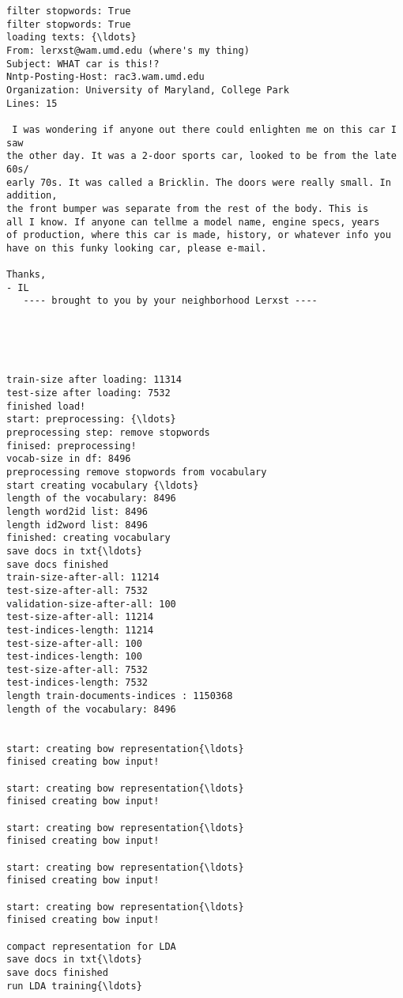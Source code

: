 \documentclass[11pt]{article}
\begin{document}
    \begin{Verbatim}[commandchars=\\\{\}]
filter stopwords: True
filter stopwords: True
loading texts: {\ldots}
From: lerxst@wam.umd.edu (where's my thing)
Subject: WHAT car is this!?
Nntp-Posting-Host: rac3.wam.umd.edu
Organization: University of Maryland, College Park
Lines: 15

 I was wondering if anyone out there could enlighten me on this car I saw
the other day. It was a 2-door sports car, looked to be from the late 60s/
early 70s. It was called a Bricklin. The doors were really small. In addition,
the front bumper was separate from the rest of the body. This is
all I know. If anyone can tellme a model name, engine specs, years
of production, where this car is made, history, or whatever info you
have on this funky looking car, please e-mail.

Thanks,
- IL
   ---- brought to you by your neighborhood Lerxst ----





train-size after loading: 11314
test-size after loading: 7532
finished load!
start: preprocessing: {\ldots}
preprocessing step: remove stopwords
finised: preprocessing!
vocab-size in df: 8496
preprocessing remove stopwords from vocabulary
start creating vocabulary {\ldots}
length of the vocabulary: 8496
length word2id list: 8496
length id2word list: 8496
finished: creating vocabulary
save docs in txt{\ldots}
save docs finished
train-size-after-all: 11214
test-size-after-all: 7532
validation-size-after-all: 100
test-size-after-all: 11214
test-indices-length: 11214
test-size-after-all: 100
test-indices-length: 100
test-size-after-all: 7532
test-indices-length: 7532
length train-documents-indices : 1150368
length of the vocabulary: 8496


start: creating bow representation{\ldots}
finised creating bow input!

start: creating bow representation{\ldots}
finised creating bow input!

start: creating bow representation{\ldots}
finised creating bow input!

start: creating bow representation{\ldots}
finised creating bow input!

start: creating bow representation{\ldots}
finised creating bow input!

compact representation for LDA
save docs in txt{\ldots}
save docs finished
run LDA training{\ldots}
\end{Verbatim}
\end{document}
